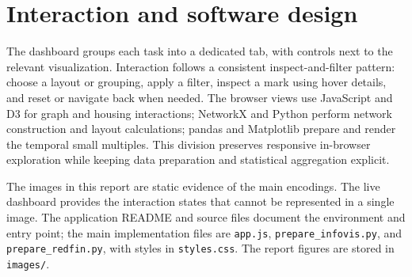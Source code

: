 \documentclass[11pt,letterpaper]{article}
\begin{document}
\section{Interaction and software design}
The dashboard groups each task into a dedicated tab, with controls next to the relevant visualization. Interaction follows a consistent inspect-and-filter pattern: choose a layout or grouping, apply a filter, inspect a mark using hover details, and reset or navigate back when needed. The browser views use JavaScript and D3 for graph and housing interactions; NetworkX and Python perform network construction and layout calculations; pandas and Matplotlib prepare and render the temporal small multiples. This division preserves responsive in-browser exploration while keeping data preparation and statistical aggregation explicit.

The images in this report are static evidence of the main encodings. The live dashboard provides the interaction states that cannot be represented in a single image. The application README and source files document the environment and entry point; the main implementation files are \texttt{app.js}, \texttt{prepare\_infovis.py}, and \texttt{prepare\_redfin.py}, with styles in \texttt{styles.css}. The report figures are stored in \texttt{images/}.
\end{document}
